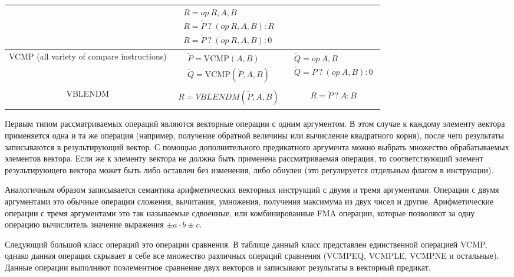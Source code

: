 \documentclass[
11pt,%
tightenlines,%
twoside,%
onecolumn,%
nofloats,%
nobibnotes,%
nofootinbib,%
superscriptaddress,%
noshowpacs,%
centertags]%
{revtex4}
\begin{document}
\begin{table}[!h]
\begin{tabular}{|c|c|c|}
& $\begin{matrix} R = op \ R, A, B \\ R = \check{P} \ ? \ (op \ R, A, B) : R \\ R = \check{P} \ ? \ (op \ R, A, B) : 0 \end{matrix}$ \\
\hline
\parbox{8cm}{VCMP (all variety of compare instructions)}
& $\begin{matrix} \check{P} = \text{VCMP}(A, B) \\ \check{Q} = \text{VCMP}(\check{P}, A, B) \end{matrix}$
& $\begin{matrix} \check{Q} = op \ A, B \\ \check{Q} = \check{P} \ ? \ (op \ A, B) : 0 \end{matrix}$ \\
\hline
\parbox{8cm}{VBLENDM}
& $\begin{matrix} R = VBLENDM(\check{P}, A, B) \end{matrix}$
& $\begin{matrix} R = \check{P} \ ? \ A : B \end{matrix}$ \\
\hline
\end{tabular}
\label{tab:avx512instructions}
\end{table}   

Первым типом рассматриваемых операций являются векторные операции с одним аргументом.
В этом случае к каждому элементу вектора применяется одна и та же операция (например, получение обратной величины или вычисление квадратного корня), после чего результаты записываются в результирующий вектор.
С помощью дополнительного предикатного аргумента можно выбрать множество обрабатываемых элементов вектора.
Если же к элементу вектора не должна быть применена рассматриваемая операция, то соответствующий элемент результирующего вектора может быть либо оставлен без изменения, либо обнулен (это регулируется отдельным флагом в инструкции).

Аналогичным образом записывается семантика арифметических векторных инструкций с двумя и тремя аргументами.
Операции с двумя аргументами это обычные операции сложения, вычитания, умножения, получения максимума из двух чисел и другие.
Арифметические операции с тремя аргументами это так называемые сдвоенные, или комбинированные FMA операции, которые позволяют за одну операцию вычислитель значение выражения $\pm a \cdot b \pm c$.

Следующий большой класс операций это операции сравнения.
В таблице данный класс представлен единственной операцией VCMP, однако данная операция скрывает в себе все множество различных операций сравнения (VCMPEQ, VCMPLE, VCMPNE и остальные).
Данные операции выполняют поэлементное сравнение двух векторов и записывают результаты в векторный предикат.
\end{document}
